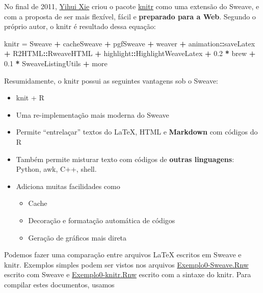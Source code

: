 \documentclass[10pt,a4paper]{book}
\newenvironment{Shaded}{\begin{snugshade}}{\end{snugshade}}
\newcommand{\FloatTok}[1]{\textcolor[rgb]{0.00,0.00,0.81}{#1}}
\newcommand{\StringTok}[1]{\textcolor[rgb]{0.31,0.60,0.02}{#1}}
\newcommand{\OperatorTok}[1]{\textcolor[rgb]{0.81,0.36,0.00}{\textbf{#1}}}
\newcommand{\NormalTok}[1]{#1}
\providecommand{\tightlist}{%
  \setlength{\itemsep}{0pt}\setlength{\parskip}{0pt}}
\begin{document}
No final de 2011, \href{http://yihui.name/}{Yihui Xie} criou o pacote
\href{http://yihui.name/knitr}{knitr} como uma extensão do Sweave, e com
a proposta de ser mais flexível, fácil e \textbf{preparado para a Web}.
Segundo o próprio autor, o knitr é resultado dessa equação:

\begin{Shaded}
\begin{Highlighting}[]
\NormalTok{knitr =}\StringTok{ }\NormalTok{Sweave }\OperatorTok{+}\StringTok{ }\NormalTok{cacheSweave }\OperatorTok{+}\StringTok{ }\NormalTok{pgfSweave }\OperatorTok{+}\StringTok{ }\NormalTok{weaver }\OperatorTok{+}
\StringTok{    }\NormalTok{animation}\OperatorTok{::}\NormalTok{saveLatex }\OperatorTok{+}\StringTok{ }\NormalTok{R2HTML}\OperatorTok{::}\NormalTok{RweaveHTML }\OperatorTok{+}
\StringTok{    }\NormalTok{highlight}\OperatorTok{::}\NormalTok{HighlightWeaveLatex }\OperatorTok{+}\StringTok{ }\FloatTok{0.2} \OperatorTok{*}\StringTok{ }\NormalTok{brew }\OperatorTok{+}
\StringTok{    }\FloatTok{0.1} \OperatorTok{*}\StringTok{ }\NormalTok{SweaveListingUtils }\OperatorTok{+}\StringTok{ }\NormalTok{more}
\end{Highlighting}
\end{Shaded}

Resumidamente, o knitr possui as seguintes vantagens sob o Sweave:

\begin{itemize}
\tightlist
\item
  knit + R
\item
  Uma re-implementação mais moderna do Sweave
\item
  Permite ``entrelaçar'' textos do LaTeX, HTML e \textbf{Markdown} com
  códigos do R
\item
  Também permite misturar texto com códigos de \textbf{outras
  linguagens}: Python, awk, C++, shell.
\item
  Adiciona muitas facilidades como

  \begin{itemize}
  \tightlist
  \item
    Cache
  \item
    Decoração e formatação automática de códigos
  \item
    Geração de gráficos mais direta
  \end{itemize}
\end{itemize}

Podemos fazer uma comparação entre arquivos LaTeX escritos em Sweave e
knitr. Exemplos simples podem ser vistos nos arquivos
\href{exemplos/Exemplo0-Sweave.Rnw}{Exemplo0-Sweave.Rnw} escrito com
Sweave e \href{exemplos/Exemplo0-knitr.Rnw}{Exemplo0-knitr.Rnw} escrito
com a sintaxe do knitr. Para compilar estes documentos, usamos
\end{document}
